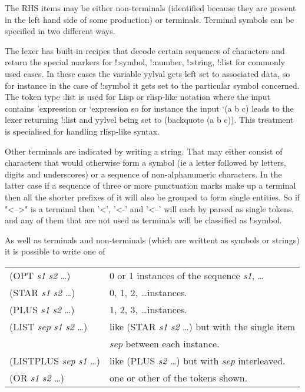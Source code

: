 \documentclass[12pt]{article}
\begin{document}
The RHS items may be either non-terminals (identified because they are
present in the left hand side of some production) or terminals. Terminal
symbols can be specified in two different ways.

The lexer has built-in recipes that decode certain sequences of characters
and return the special markers for !:symbol, !:number, !:string, !:list for
commonly used cases. In these cases the variable yylval gets left set
to associated data, so for instance in the case of !:symbol it gets set
to the particular symbol concerned.
The token type :list is used for Lisp or rlisp-like notation where the
input contains
    'expression
or  `expression
so for instance the input `(a b c) leads to the lexer returning !:list and
yylvel being set to (backquote (a b c)). This treatment is specialised for
handling rlisp-like syntax.

Other terminals are indicated by writing a string. That may either
consist of characters that would otherwise form a symbol (ie a letter
followed by letters, digits and underscores) or a sequence of
non-alphanumeric characters. In the latter case if a sequence of three or
more punctuation marks make up a terminal then all the shorter prefixes
of it will also be grouped to form single entities. So if "<-->" is a
terminal then '<', '<-' and '<--' will each by parsed as single tokens, and
any of them that are not used as terminals will be classified as !:symbol.

As well as terminals and non-terminals (which are writtent as symbols or
strings) it is possible to write one of

\begin{tabular}{l l}
    ({\ttfamily OPT} \textit{s1} \textit{s2} \ldots)      &     0 or 1 instances of the sequence \textit{s1}, \ldots \\
    ({\ttfamily STAR} \textit{s1} \textit{s2} \ldots)     &     0, 1, 2, \ldots instances. \\
    ({\ttfamily PLUS} \textit{s1} \textit{s2} \ldots)     &     1, 2, 3, \ldots instances. \\
    ({\ttfamily LIST} \textit{sep} \textit{s1} \textit{s2} \ldots) &     like ({\ttfamily STAR} \textit{s1} \textit{s2} \ldots) but with the single item \\
                            &     \textit{sep} between each instance. \\
    ({\ttfamily LISTPLUS} \textit{sep} \textit{s1} \ldots) &    like ({\ttfamily PLUS} \textit{s2} \ldots) but with \textit{sep} interleaved. \\
    ({\ttfamily OR} \textit{s1} \textit{s2} \ldots)        &    one or other of the tokens shown.
\end{tabular}
\end{document}
